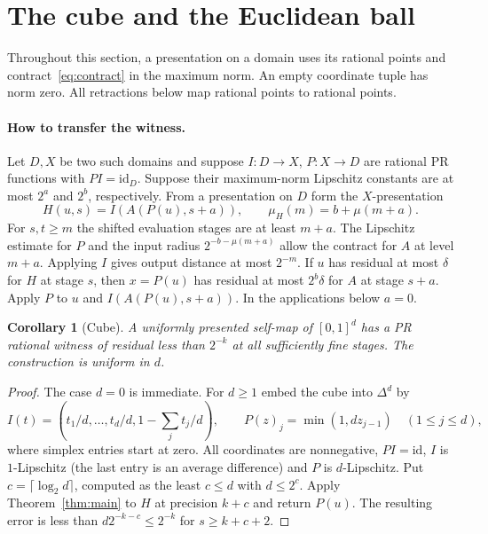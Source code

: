 \documentclass[11pt,letterpaper]{article}
\theoremstyle{claim}\newtheorem{theorem}{Theorem}\newtheorem{lemma}[theorem]{Lemma}
\newtheorem{corollary}[theorem]{Corollary}
\begin{document}
\section{The cube and the Euclidean ball}\label{sec:domains}
Throughout this section, a presentation on a domain uses its rational points
and contract~\eqref{eq:contract} in the maximum norm. An empty coordinate
tuple has norm zero. All retractions below map rational points to rational points.

\paragraph{How to transfer the witness.}
Let $D,X$ be two such domains and suppose $I:D\to X$, $P:X\to D$ are
rational PR functions with $PI=\mathrm{id}_D$. Suppose their maximum-norm
Lipschitz constants are at most $2^a$ and $2^b$, respectively. From a
presentation on $D$ form the $X$-presentation
\[
 H(u,s)= I(A(P(u),s+a)),\qquad \mu_H(m)=b+\mu(m+a).
\]
For $s,t\ge m$ the shifted evaluation stages are at least $m+a$.
The Lipschitz estimate for $P$ and the input radius
$2^{-b-\mu(m+a)}$ allow the contract for $A$ at level $m+a$.
Applying $I$ gives output distance at most $2^{-m}$.
If $u$ has residual at most $\delta$ for $H$ at stage $s$, then
$x=P(u)$ has residual at most $2^b\delta$ for $A$ at stage $s+a$. Apply $P$ to $u$ and $I(A(P(u),s+a))$.
In the applications below $a=0$. 

\begin{corollary}[Cube]\label{cor:cube}
A uniformly presented self-map of $[0,1]^d$ has a PR rational witness of
residual less than $2^{-k}$ at all sufficiently fine stages. The construction
is uniform in $d$.
\end{corollary}
\begin{proof}
The case $d=0$ is immediate. For $d\ge1$ embed the cube into $\Delta^d$ by
\[
 I(t)=(t_1/d,\ldots,t_d/d,1-\textstyle\sum_j t_j/d),\qquad
 P(z)_j=\min(1,dz_{j-1})\quad(1\le j\le d),
\]
where simplex entries start at zero. All coordinates are nonnegative,
$PI=\mathrm{id}$, $I$ is $1$-Lipschitz (the last entry is an average
difference) and $P$ is $d$-Lipschitz. Put $c=\lceil\log_2 d\rceil$,
computed as the least $c\le d$ with $d\le2^c$. Apply Theorem~\ref{thm:main}
to $H$ at precision $k+c$ and return $P(u)$. The resulting error is less
than $d2^{-k-c}\le2^{-k}$ for $s\ge k+c+2$.
\end{proof}
\end{document}
